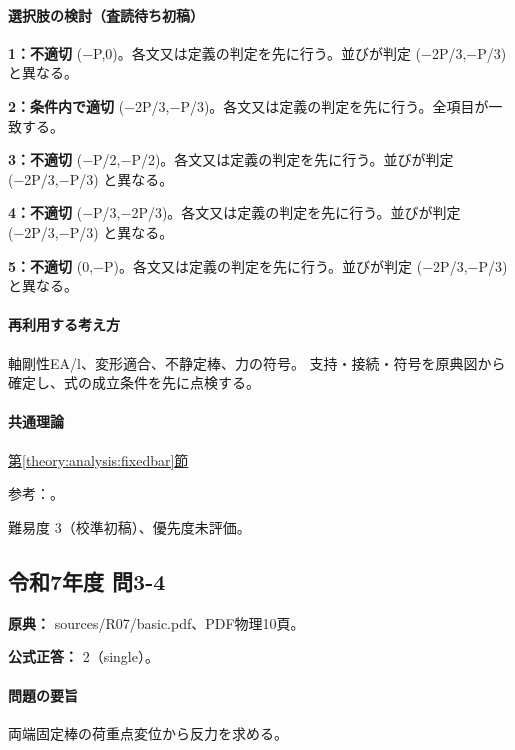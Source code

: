 \paragraph{選択肢の検討（査読待ち初稿）}\mbox{}\par

\noindent\textbf{1：不適切} (−P,0)。各文又は定義の判定を先に行う。並びが判定 (−2P/3,−P/3) と異なる。\par

\noindent\textbf{2：条件内で適切} (−2P/3,−P/3)。各文又は定義の判定を先に行う。全項目が一致する。\par

\noindent\textbf{3：不適切} (−P/2,−P/2)。各文又は定義の判定を先に行う。並びが判定 (−2P/3,−P/3) と異なる。\par

\noindent\textbf{4：不適切} (−P/3,−2P/3)。各文又は定義の判定を先に行う。並びが判定 (−2P/3,−P/3) と異なる。\par

\noindent\textbf{5：不適切} (0,−P)。各文又は定義の判定を先に行う。並びが判定 (−2P/3,−P/3) と異なる。\par

\paragraph{再利用する考え方} 軸剛性EA/l、変形適合、不静定棒、力の符号。 支持・接続・符号を原典図から確定し、式の成立条件を先に点検する。

\paragraph{共通理論} \hyperref[theory:analysis:fixedbar]{第\ref*{theory:analysis:fixedbar}節}

\par 参考：\cite{mit_material_elastic2000}。

\par 難易度 3（校準初稿）、優先度未評価。

\subsection{令和7年度 問3-4}
\label{q:r07-reg-basic-3-4}

\noindent\textbf{原典：} sources/R07/basic.pdf、PDF物理10頁。

\textbf{公式正答：} 2（single）。

\paragraph{問題の要旨} 両端固定棒の荷重点変位から反力を求める。

